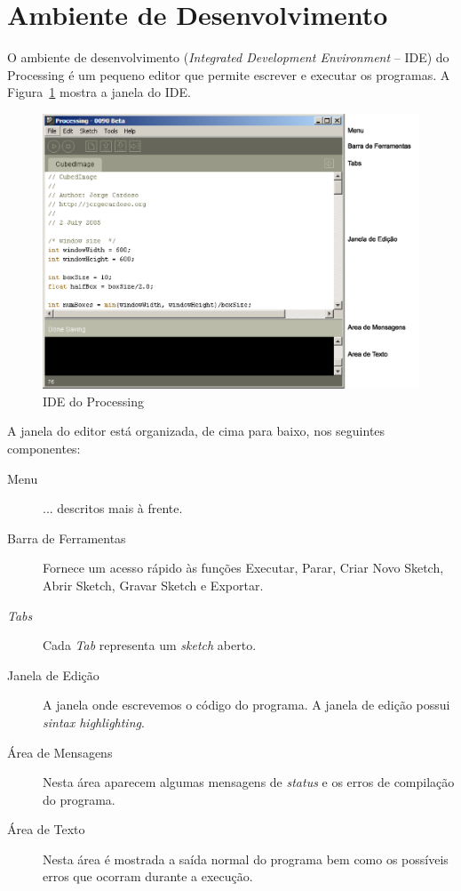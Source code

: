\section{Ambiente de Desenvolvimento}
O ambiente de desenvolvimento (\emph{Integrated Development Environment} -- IDE) do Processing é um pequeno editor que permite escrever e executar os programas. 
A Figura~\ref{fig:ide} mostra a janela do IDE. 
\begin{figure}[!hbp]
	\centering
		\includegraphics[width=.9\textwidth]{images/ide.eps}
	\caption{IDE do Processing}
	\label{fig:ide}
\end{figure}

A janela do editor está organizada, de cima para baixo, nos seguintes componentes:
\begin{description}
\item[Menu] ... descritos mais à frente.
\item[Barra de Ferramentas] Fornece um acesso rápido às funções Executar, Parar, Criar Novo Sketch, Abrir Sketch, Gravar Sketch e Exportar.
\item[\emph{Tabs}] Cada \emph{Tab} representa um \emph{sketch} aberto.
\item[Janela de Edição] A janela onde escrevemos o código do programa. A janela de edição possui \emph{sintax highlighting}.
\item[Área de Mensagens] Nesta área aparecem algumas mensagens de \emph{status} e os erros de compilação do programa.
\item[Área de Texto] Nesta área é mostrada a saída normal do programa bem como os possíveis erros que ocorram durante a execução.
\end{description}

